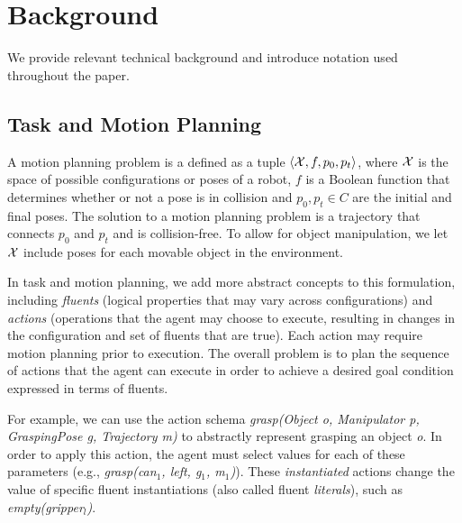 \section{Background}
We provide relevant technical background and introduce notation
used throughout the paper. 

\subsection{Task and Motion Planning}

A motion planning problem is a defined as a tuple $\langle \mathcal{X}, f, p_0,
  p_t \rangle$, where $\mathcal{X}$ is the space of possible configurations or poses
of a robot, $f$ is a Boolean function that determines whether or not a
pose is in collision and $p_0, p_t\in C$ are the initial and final
poses. The solution to a motion planning problem is a trajectory that
connects $p_0$ and $p_t$ and is collision-free. To allow for object
manipulation, we let $\mathcal{X}$ include poses for each movable object in the
environment. 

In task and motion planning, we add more abstract concepts to this
formulation, including \emph{fluents} (logical properties that may
vary across configurations) and \emph{actions} (operations that the
agent may choose to execute, resulting in changes in the configuration
and set of fluents that are true). Each action may require motion
planning prior to execution.  The overall problem is to plan the
sequence of actions that the agent can execute in order to achieve a
desired goal condition expressed in terms of fluents.

For example, we can use the action schema \emph{grasp(Object o,
  Manipulator p, GraspingPose g, Trajectory m)} to abstractly
represent grasping an object \emph{o}.  In order to apply this action,
the agent must select values for each of these parameters (e.g.,
\emph{grasp(can$_1$, left, g$_1$, m$_1$)}). These \emph{instantiated}
actions change the value of specific fluent instantiations (also
called fluent \emph{literals}), such as \emph{empty(gripper$_l$)}.

